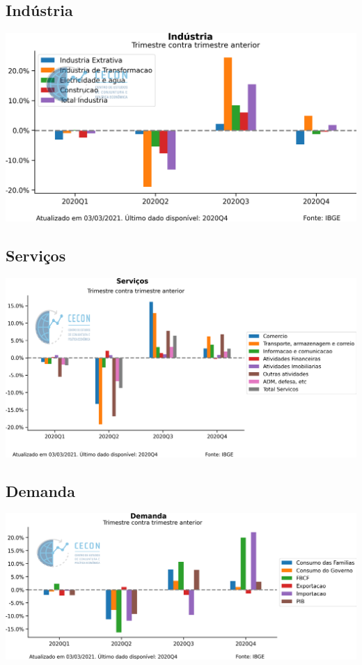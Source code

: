 \documentclass{SelfArx}
\begin{document}
\subsection*{Indústria}
\label{sec:orgaafde92}

\begin{center}
\includegraphics[width=.9\linewidth]{./figs/PIB/Industria.png}
\end{center}


\subsection*{Serviços}
\label{sec:org16dcd26}

\begin{center}
\includegraphics[width=.9\linewidth]{./figs/PIB/Servicos.png}
\end{center}

\subsection*{Demanda}
\label{sec:org0be2aef}

\begin{center}
\includegraphics[width=.9\linewidth]{./figs/PIB/Demanda.png}
\end{center}
\end{document}
